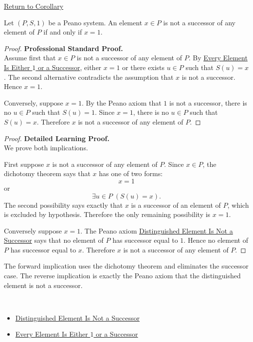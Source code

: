 \newpage
{}
\label{prf:one-is-unique-non-successor}

\begin{remark*}[Return]
\hyperref[cor:one-is-unique-non-successor]{Return to Corollary}
\end{remark*}

\begin{corollary*}
Let $(P,S,1)$ be a Peano system. An element $x \in P$ is not a successor of
any element of $P$ if and only if $x=1$.
\end{corollary*}

\begin{proof}
\textbf{Professional Standard Proof.}~\\
Assume first that $x\in P$ is not a successor of any element of $P$. By
\hyperref[thm:every-element-is-one-or-a-successor]{Every Element Is Either
$1$ or a Successor}, either $x=1$ or there exists $u\in P$ such that
$S(u)=x$. The second alternative contradicts the assumption that $x$ is not a
successor. Hence $x=1$.

Conversely, suppose $x=1$. By the Peano axiom that $1$ is not a successor,
there is no $u\in P$ such that $S(u)=1$. Since $x=1$, there is no $u\in P$
such that $S(u)=x$. Therefore $x$ is not a successor of any element of $P$.
\end{proof}

\begin{proof}
\textbf{Detailed Learning Proof.}~\\
We prove both implications.

First suppose $x$ is not a successor of any element of $P$. Since $x\in P$,
the dichotomy theorem says that $x$ has one of two forms:
\[
x=1
\]
or
\[
\exists u\in P\;(S(u)=x).
\]
The second possibility says exactly that $x$ is a successor of an element of
$P$, which is excluded by hypothesis. Therefore the only remaining
possibility is $x=1$.

Conversely suppose $x=1$. The Peano axiom
\hyperref[ax:peano-one-not-successor]{Distinguished Element Is Not a
Successor} says that no element of $P$ has successor equal to $1$. Hence no
element of $P$ has successor equal to $x$. Therefore $x$ is not a successor
of any element of $P$.
\end{proof}

\begin{remark*}
The forward implication uses the dichotomy theorem and eliminates the
successor case. The reverse implication is exactly the Peano axiom that the
distinguished element is not a successor.
\end{remark*}

\begin{remark*}[Dependencies]~\\
\begin{itemize}
  \item \hyperref[ax:peano-one-not-successor]{Distinguished Element Is Not a Successor}
  \item \hyperref[thm:every-element-is-one-or-a-successor]{Every Element Is Either $1$ or a Successor}
\end{itemize}
\end{remark*}
